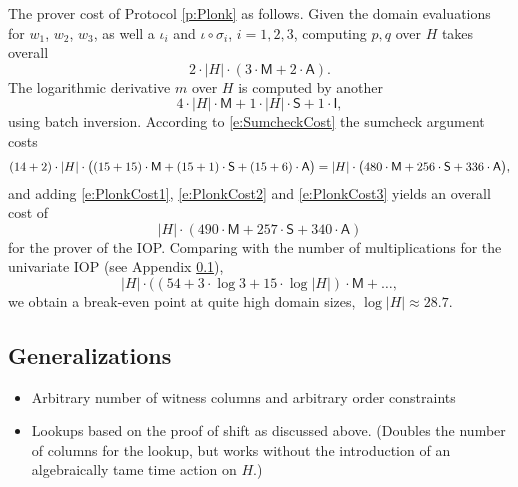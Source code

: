 \documentclass[11pt]{article}
\theoremstyle{definition}
\theoremstyle{remark}
\begin{document}
The prover cost of Protocol \ref{p:Plonk} as follows. 
Given the domain evaluations for $w_1$, $w_2$, $w_3$, as well a $\iota_i$ and $\iota\circ\sigma_i$, $i=1,2,3$, 
computing $p, q$ over $H$ takes overall
\begin{equation}
\label{e:PlonkCost1}
 2\cdot |H|\cdot ( 3\cdot\mathsf M + 2\cdot\mathsf A).
\end{equation}
The logarithmic derivative $m$ over $H$ is computed by another 
\begin{equation}
\label{e:PlonkCost2}
4\cdot |H| \cdot\mathsf M + 1\cdot |H|\cdot \mathsf S + 1\cdot\mathsf I,
\end{equation}
using batch inversion.
According to \eqref{e:SumcheckCost} the sumcheck argument costs
\begin{equation}
\label{e:PlonkCost3}
(14 + 2) \cdot |H| \cdot \big((15 + 15) \cdot\textsf M +  (15 + 1) \cdot\textsf S + (15 + 6) \cdot \textsf A\big) 
=  |H| \cdot \big(480 \cdot\textsf M +  256\cdot\textsf S + 336 \cdot \textsf A\big),
\end{equation}
and adding \eqref{e:PlonkCost1}, \eqref{e:PlonkCost2} and \eqref{e:PlonkCost3} yields an overall cost of 
\begin{equation}
|H|\cdot (490\cdot\mathsf M + 257\cdot \mathsf S + 340\cdot \mathsf A)
\end{equation}
for the prover of the IOP.
Comparing with the number of multiplications for the univariate IOP (see Appendix \ref{}), 
\begin{equation}
|H| \cdot ((54 + 3\cdot\log 3 + 15\cdot \log|H|)\cdot\mathsf M + \ldots,
\end{equation}
we obtain a break-even point at quite high domain sizes, $\log |H| \approx 28.7$.

\subsection{Generalizations}

\begin{itemize}
\item
Arbitrary number of witness columns and arbitrary order constraints
\item
Lookups based on the proof of shift as discussed above. (Doubles the number of columns for the lookup, but works without the introduction of an algebraically tame time action on $H$.) 
\end{itemize}
\end{document}
